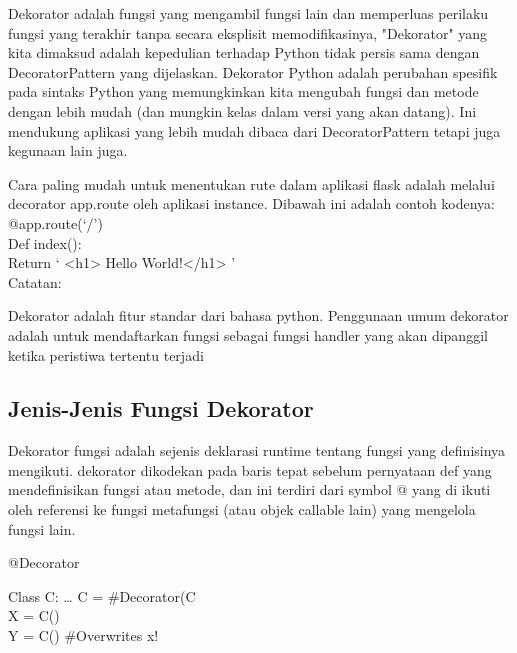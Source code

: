 \documentclass[12pt,a4paper]{article}
\begin{document}
Dekorator adalah fungsi yang mengambil fungsi lain dan memperluas perilaku fungsi yang terakhir tanpa secara eksplisit memodifikasinya, "Dekorator" yang kita dimaksud adalah kepedulian terhadap Python tidak persis sama dengan DecoratorPattern yang dijelaskan. Dekorator Python adalah perubahan spesifik pada sintaks Python yang memungkinkan kita mengubah fungsi dan metode dengan lebih mudah (dan mungkin kelas dalam versi yang akan datang). Ini mendukung aplikasi yang lebih mudah dibaca dari DecoratorPattern tetapi juga kegunaan lain juga.

Cara paling mudah untuk menentukan rute dalam aplikasi flask adalah melalui decorator app.route oleh aplikasi instance. Dibawah ini adalah contoh kodenya:\\

@app.route(‘/’)\\
Def index():\\
      Return ‘ <h1> Hello World!</h1> ’\\

Catatan:

Dekorator adalah fitur standar dari bahasa python. Penggunaan umum dekorator adalah untuk mendaftarkan fungsi sebagai fungsi handler yang akan dipanggil ketika peristiwa tertentu terjadi

\subsection{Jenis-Jenis Fungsi Dekorator}


Dekorator fungsi adalah sejenis deklarasi runtime tentang fungsi yang definisinya mengikuti. dekorator dikodekan pada baris tepat sebelum pernyataan def yang mendefinisikan fungsi atau metode, dan ini terdiri dari symbol @ yang di ikuti oleh referensi ke fungsi metafungsi (atau objek callable lain) yang mengelola fungsi lain.

@Decorator

       Class C: … C = \#Decorator(C\\
            X = C()\\
            Y = C() \#Overwrites x!\\
            
            
\end{document}
